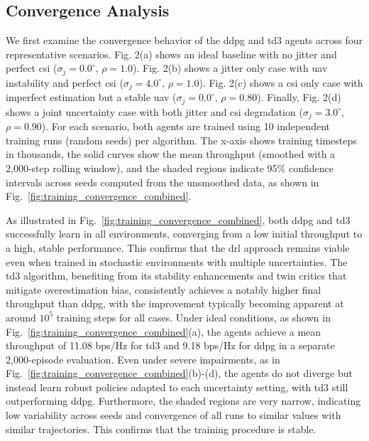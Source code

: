 \documentclass[letterpaper,journal]{IEEEtran}
\begin{document}
\subsection{Convergence Analysis}
\label{ssec:convergence_analysis}
We first examine the convergence behavior of the \gls{ddpg} and \gls{td3} agents across four representative scenarios. Fig. 2(a) shows an ideal baseline with no jitter and perfect \gls{csi} ($\sigma_{j} = 0.0^\circ$, $\rho = 1.0$). Fig. 2(b) shows a jitter only case with \gls{uav} instability and perfect \gls{csi} ($\sigma_{j} = 4.0^\circ$, $\rho = 1.0$). Fig. 2(c) shows a \gls{csi} only case with imperfect estimation but a stable \gls{uav} ($\sigma_{j} = 0.0^\circ$, $\rho = 0.80$). Finally, Fig. 2(d) shows a joint uncertainty case with both jitter and \gls{csi} degradation ($\sigma_{j} = 3.0^\circ$, $\rho = 0.90$). For each scenario, both agents are trained using 10 independent training runs (random seeds) per algorithm. The x-axis shows training timesteps in thousands, the solid curves show the mean throughput (smoothed with a 2{,}000-step rolling window), and the shaded regions indicate 95\% confidence intervals across seeds computed from the unsmoothed data, as shown in Fig.~\ref{fig:training_convergence_combined}.



\noindent As illustrated in Fig.~\ref{fig:training_convergence_combined}, both \gls{ddpg} and \gls{td3} successfully learn in all environments, converging from a low initial throughput to a high, stable performance. This confirms that the \gls{drl} approach remains viable even when trained in stochastic environments with multiple uncertainties. The \gls{td3} algorithm, benefiting from its stability enhancements and twin critics that mitigate overestimation bias, consistently achieves a notably higher final throughput than \gls{ddpg}, with the improvement typically becoming apparent at around $10^5$ training steps for all cases. Under ideal conditions, as shown in Fig.~\ref{fig:training_convergence_combined}(a), the agents achieve a mean throughput of 11.08 bps/Hz for \gls{td3} and 9.18 bps/Hz for \gls{ddpg} in a separate 2{,}000-episode evaluation. Even under severe impairments, as in Fig.~\ref{fig:training_convergence_combined}(b)-(d), the agents do not diverge but instead learn robust policies adapted to each uncertainty setting, with \gls{td3} still outperforming \gls{ddpg}. Furthermore, the shaded regions are very narrow, indicating low variability across seeds and convergence of all runs to similar values with similar trajectories. This confirms that the training procedure is stable.
\end{document}
